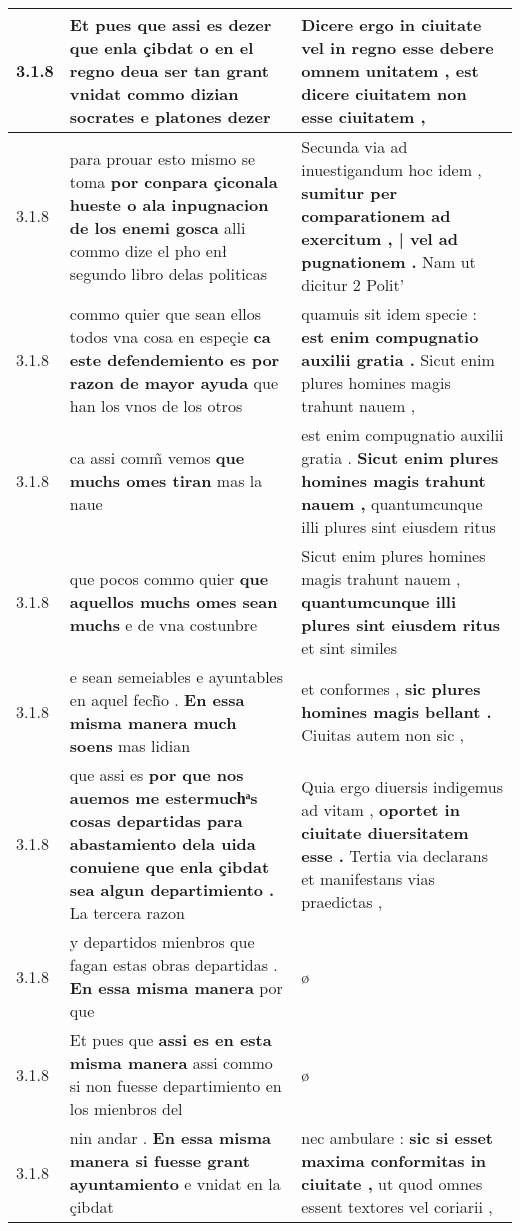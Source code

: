 \begin{tabular}{|p{1cm}|p{6.5cm}|p{6.5cm}|}
3.1.8 & Et pues que assi es dezer \textbf{ que enla çibdat o en el regno deua ser tan grant vnidat } commo dizian socrates e platones dezer & Dicere ergo in ciuitate \textbf{ vel in regno esse debere omnem unitatem , } est dicere ciuitatem non esse ciuitatem , \\\hline
3.1.8 & para prouar esto mismo se toma \textbf{ por conpara çiconala hueste o ala inpugnacion de los enemi gosca } alli commo dize el pho enł segundo libro delas politicas & Secunda via ad inuestigandum hoc idem , \textbf{ sumitur per comparationem ad exercitum , | vel ad pugnationem . } Nam ut dicitur 2 Polit’ \\\hline
3.1.8 & commo quier que sean ellos todos vna cosa en espeçie \textbf{ ca este defendemiento es por razon de mayor ayuda } que han los vnos de los otros & quamuis sit idem specie : \textbf{ est enim compugnatio auxilii gratia . } Sicut enim plures homines magis trahunt nauem , \\\hline
3.1.8 & ca assi comm̃ vemos \textbf{ que muchs omes tiran } mas la naue & est enim compugnatio auxilii gratia . \textbf{ Sicut enim plures homines magis trahunt nauem , } quantumcunque illi plures sint eiusdem ritus \\\hline
3.1.8 & que pocos commo quier \textbf{ que aquellos muchs omes sean muchs } e de vna costunbre & Sicut enim plures homines magis trahunt nauem , \textbf{ quantumcunque illi plures sint eiusdem ritus } et sint similes \\\hline
3.1.8 & e sean semeiables e ayuntables en aquel fech̃o . \textbf{ En essa misma manera much soens } mas lidian & et conformes , \textbf{ sic plures homines magis bellant . } Ciuitas autem non sic , \\\hline
3.1.8 & que assi es \textbf{ por que nos auemos me estermuchͣs cosas departidas para abastamiento dela uida conuiene que enla çibdat sea algun departimiento . } La tercera razon & Quia ergo diuersis indigemus ad vitam , \textbf{ oportet in ciuitate diuersitatem esse . } Tertia via declarans et manifestans vias praedictas , \\\hline
3.1.8 & y departidos mienbros que fagan estas obras departidas . \textbf{ En essa misma manera } por que & ø \\\hline
3.1.8 & Et pues que \textbf{ assi es en esta misma manera } assi commo si non fuesse departimiento en los mienbros del & ø \\\hline
3.1.8 & nin andar . \textbf{ En essa misma manera si fuesse grant ayuntamiento } e vnidat en la çibdat & nec ambulare : \textbf{ sic si esset maxima conformitas in ciuitate , } ut quod omnes essent textores vel coriarii , \\\hline

\end{tabular}
